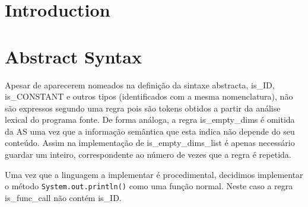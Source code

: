 \documentclass[a4paper]{article}
\title{\documentTitle}
\author{\documentAuthors{}}
\begin{document}
\renewcommand{\figurename}{Figure}
\maketitle
\cleardoublepage

\tableofcontents
\cleardoublepage

\setlength{\parindent}{1cm}
\setlength{\parskip}{0.3cm}

\section{Introduction}
\section{Abstract Syntax}
\indent \indent Apesar de aparecerem nomeados na definição da sintaxe abstracta, is\_ID, \\
is\_CONSTANT e outros tipos (identificados com a mesma nomenclatura),
não são expressos segundo uma regra pois são tokens obtidos a partir da análise lexical do programa fonte.
De forma análoga, a regra is\_empty\_dims é omitida da AS uma vez que a informação semântica que esta indica não depende do seu conteúdo.
Assim na implementação de is\_empty\_dims\_list é apenas necessário guardar um inteiro, correspondente ao número de vezes que a regra é repetida.

Uma vez que a linguagem a implementar é procedimental, decidimos implementar o método \texttt{System.out.println()} como uma função normal.
Neste caso a regra is\_func\_call não contém is\_ID. 
\end{document}
